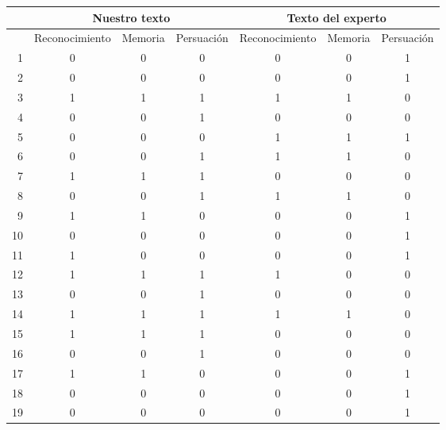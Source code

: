 \begin{table}
\centering
\tiny
\begin{tabular}{|r|c|c|c|c|c|c|}
   & \multicolumn{3}{c|}{Nuestro texto}     & \multicolumn{3}{c|}{Texto del experto}   \\\hline
   & Reconocimiento & Memoria & Persuación & Reconocimiento & Memoria & Persuación \\\hline \hline

1 &         0 &         0 &         0 &         0 &         0 &         1 \\
2 &         0 &         0 &         0 &         0 &         0 &         1 \\
3 &         1 &         1 &         1 &         1 &         1 &         0 \\
4 &         0 &         0 &         1 &         0 &         0 &         0 \\
5 &         0 &         0 &         0 &         1 &         1 &         1 \\
6 &         0 &         0 &         1 &         1 &         1 &         0 \\
7 &         1 &         1 &         1 &         0 &         0 &         0 \\
8 &         0 &         0 &         1 &         1 &         1 &         0 \\
9 &         1 &         1 &         0 &         0 &         0 &         1 \\
10 &         0 &         0 &         0 &         0 &         0 &         1 \\
11 &         1 &         0 &         0 &         0 &         0 &         1 \\
12 &         1 &         1 &         1 &         1 &         0 &         0 \\
13 &         0 &         0 &         1 &         0 &         0 &         0 \\
14 &         1 &         1 &         1 &         1 &         1 &         0 \\
15 &         1 &         1 &         1 &         0 &         0 &         0 \\
16 &         0 &         0 &         1 &         0 &         0 &         0 \\
17 &         1 &         1 &         0 &         0 &         0 &         1 \\
18 &         0 &         0 &         0 &         0 &         0 &         1 \\
19 &         0 &         0 &         0 &         0 &         0 &         1 \\

\end{tabular}
\end{table}
